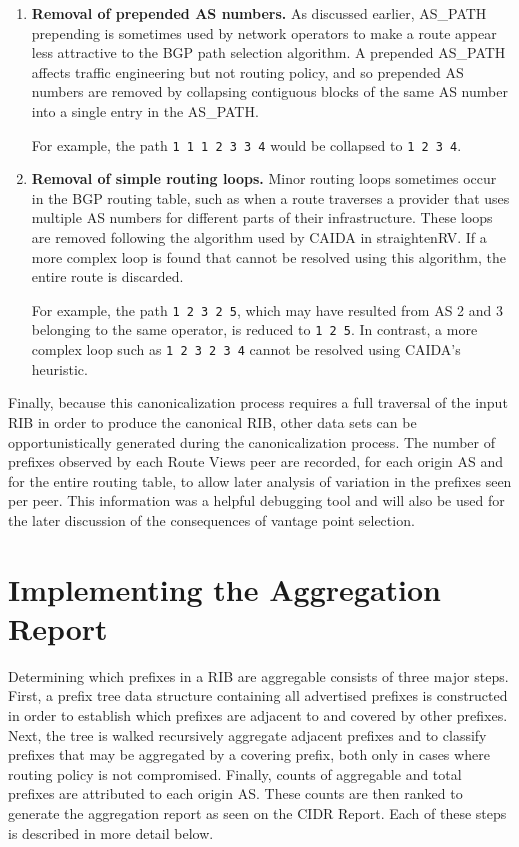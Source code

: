 \begin{enumerate}
    \item{\textbf{Removal of prepended AS numbers.} As discussed earlier,
    AS\_PATH prepending is sometimes used by network operators to make a route
    appear less attractive to the BGP path selection algorithm. A prepended
    AS\_PATH affects traffic engineering but not routing policy, and so
    prepended AS numbers are removed by collapsing contiguous blocks of the
    same AS number into a single entry in the AS\_PATH.

    For example, the path \verb!1 1 1 2 3 3 4! would be collapsed to
    \verb!1 2 3 4!.}

    \item{\textbf{Removal of simple routing loops.} Minor routing loops
    sometimes occur in the BGP routing table, such as when a route traverses a
    provider that uses multiple AS numbers for different parts of their
    infrastructure. These loops are removed following the algorithm used by
    CAIDA in straightenRV\cite{straightenrv}. If a more complex loop is found
    that cannot be resolved using this algorithm, the entire route is
    discarded.

    For example, the path \verb!1 2 3 2 5!, which may have resulted from AS 2
    and 3 belonging to the same operator, is reduced to \verb!1 2 5!. In
    contrast, a more complex loop such as \verb!1 2 3 2 3 4! cannot be resolved
    using CAIDA's heuristic.}
\end{enumerate}

Finally, because this canonicalization process requires a full traversal of the
input RIB in order to produce the canonical RIB, other data sets can be
opportunistically generated during the canonicalization process. The number of
prefixes observed by each Route Views peer are recorded, for each origin AS and
for the entire routing table, to allow later analysis of variation in the
prefixes seen per peer. This information was a helpful debugging tool and
will also be used for the later discussion of the consequences of vantage
point selection.

\section{Implementing the Aggregation Report}

Determining which prefixes in a RIB are aggregable consists of three major
steps. First, a prefix tree data structure containing all advertised prefixes
is constructed in order to establish which prefixes are adjacent to and covered
by other prefixes. Next, the tree is walked recursively aggregate adjacent
prefixes and to classify prefixes that may be aggregated by a covering prefix,
both only in cases where routing policy is not compromised. Finally, counts of
aggregable and total prefixes are attributed to each origin AS. These counts
are then ranked to generate the aggregation report as seen on the CIDR Report.
Each of these steps is described in more detail below.


